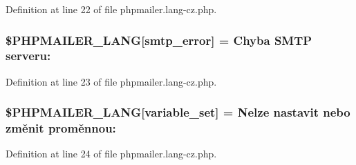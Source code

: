 Definition at line 22 of file phpmailer.\+lang-\/cz.\+php.

\subsubsection[{\texorpdfstring{\$\+P\+H\+P\+M\+A\+I\+L\+E\+R\+\_\+\+L\+A\+NG}{$PHPMAILER_LANG}}]{\setlength{\rightskip}{0pt plus 5cm}\$P\+H\+P\+M\+A\+I\+L\+E\+R\+\_\+\+L\+A\+NG\mbox{[}\textquotesingle{}smtp\+\_\+error\textquotesingle{}\mbox{]} = \textquotesingle{}Chyba {\bf S\+M\+TP} serveru\+: \textquotesingle{}}\hypertarget{phpmailer_8lang-cz_8php_a7d9cffba1e669c845f8a4c891ee50064}{}\label{phpmailer_8lang-cz_8php_a7d9cffba1e669c845f8a4c891ee50064}


Definition at line 23 of file phpmailer.\+lang-\/cz.\+php.

\subsubsection[{\texorpdfstring{\$\+P\+H\+P\+M\+A\+I\+L\+E\+R\+\_\+\+L\+A\+NG}{$PHPMAILER_LANG}}]{\setlength{\rightskip}{0pt plus 5cm}\$P\+H\+P\+M\+A\+I\+L\+E\+R\+\_\+\+L\+A\+NG\mbox{[}\textquotesingle{}variable\+\_\+set\textquotesingle{}\mbox{]} = \textquotesingle{}Nelze nastavit nebo změnit proměnnou\+: \textquotesingle{}}\hypertarget{phpmailer_8lang-cz_8php_af795debc7a739d038742691c358d9032}{}\label{phpmailer_8lang-cz_8php_af795debc7a739d038742691c358d9032}


Definition at line 24 of file phpmailer.\+lang-\/cz.\+php.


